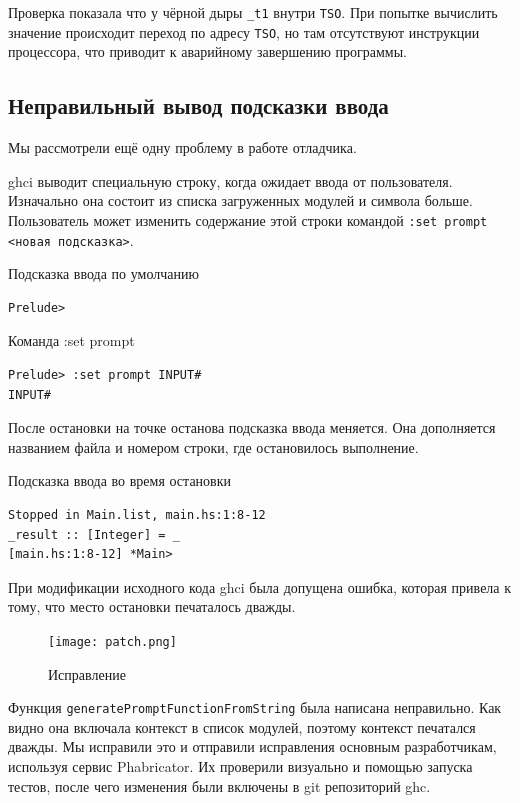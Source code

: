 \documentclass[fontsize=14pt, paper=a4, pagesize, DIV=calc]{scrartcl}
\def\code#1{\texttt{#1}}
\begin{document}
Проверка показала что у чёрной дыры \code{\_t1} внутри \code{TSO}. При попытке
вычислить значение происходит переход по адресу \code{TSO}, но там отсутствуют
инструкции процессора, что приводит к аварийному завершению программы.

\subsection{Неправильный вывод подсказки ввода}

Мы рассмотрели ещё одну проблему в работе отладчика\cite{fixedissue}.

ghci выводит специальную строку, когда ожидает ввода от пользователя.
Изначально она состоит из списка загруженных модулей и символа больше.
Пользователь может изменить содержание этой строки командой \code{:set prompt
<новая подсказка>}.

\begin{ListingEnv}
\caption{Подсказка ввода по умолчанию}
\begin{lstlisting}[numbers=none]
Prelude>
\end{lstlisting}
\end{ListingEnv}

\begin{ListingEnv}
\caption{Команда :set prompt}
\begin{lstlisting}[numbers=none]
Prelude> :set prompt INPUT#
INPUT#
\end{lstlisting}
\end{ListingEnv}

После остановки на точке останова подсказка ввода меняется. Она дополняется названием
файла и номером строки, где остановилось выполнение.

\begin{ListingEnv}
\caption{Подсказка ввода во время остановки}
\begin{lstlisting}[numbers=none]
Stopped in Main.list, main.hs:1:8-12
_result :: [Integer] = _
[main.hs:1:8-12] *Main> 
\end{lstlisting}
\end{ListingEnv}

При модификации исходного кода ghci была допущена ошибка, которая привела к тому,
что место остановки печаталось дважды.

\begin{figure}[H]
\centering
\caption{Исправление}
\label{fig:compilation}
\texttt{[image: patch.png]}
\end{figure}

Функция \code{generatePromptFunctionFromString} была написана неправильно. Как
видно она включала контекст в список модулей, поэтому контекст печатался
дважды. Мы исправили это и отправили исправления основным разработчикам,
используя сервис Phabricator\cite{patch}. Их проверили визуально и помощью
запуска тестов, после чего изменения были включены в git репозиторий ghc.
\end{document}
